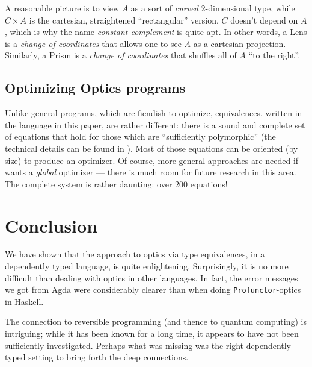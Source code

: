 \documentclass[sigplan,review,anonymous]{acmart}\settopmatter{printfolios=true,printccs=false,printacmref=false}
\begin{document}
A reasonable picture is to view $A$ as a sort of \emph{curved}
2-dimensional type, while
$C × A$ is the cartesian, straightened ``rectangular'' version. $C$ doesn't depend on $A$, which is
why the name \emph{constant complement} is quite apt.  In other words, a Lens is a
\emph{change of coordinates}
that allows one to see $A$ as a cartesian projection. Similarly, a Prism is a
\emph{change of coordinates} that shuffles all of $A$ ``to the right''.

\subsection{Optimizing Optics programs}

Unlike general programs, which are fiendish to optimize, equivalences, written
in the language in this paper, are rather different: there is a sound and
complete set of equations that hold for those which are
``sufficiently polymorphic'' (the technical details can be found in
\cite{laplaza72,Fiore-2008}).  Most of those equations can be oriented
(by size) to produce an optimizer.  Of course, more general approaches are
needed if wants a \emph{global} optimizer --- there is much room for future
research in this area.  The complete system is rather daunting: over $200$
equations!

\section{Conclusion}

We have shown that the approach to optics via type equivalences, in a
dependently typed language, is quite enlightening. Surprisingly, it is
no more difficult than dealing with optics in other languages. In fact,
the error messages we got from Agda were considerably clearer than when
doing \texttt{Profunctor}-optics in Haskell.

The connection to reversible programming (and thence to quantum computing)
is intriguing; while it has been known for a long time, it appears to have
not been sufficiently investigated.  Perhaps what was missing was the right
dependently-typed setting to bring forth the deep connections.



\end{document}
